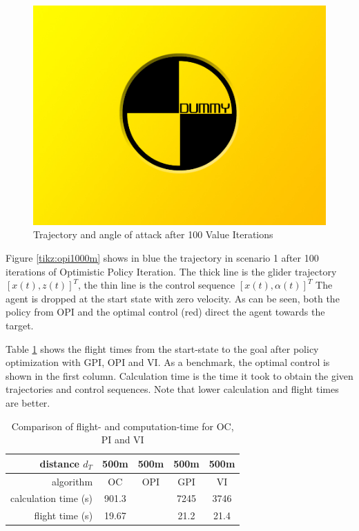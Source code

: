 \begin{figure}[h]
	\includegraphics[width=\textwidth]{src/pics/dummy.jpg}
	\caption{Trajectory and angle of attack after 100 Value Iterations}
	\label{fig:2d_trajectory_VI}
\end{figure}

Figure \ref{tikz:opi1000m} shows in blue the trajectory in scenario 1 after 100 iterations of Optimistic Policy Iteration. The thick line is the glider trajectory $[x(t),z(t)]^T$, the thin line is the control sequence $[x(t),\alpha(t)]^T$ The agent is dropped at the start state with zero velocity. As can be seen, both the policy from OPI and the optimal control (red) direct the agent towards the target.

Table \ref{tab:2d_flight_times} shows the flight times from the start-state to the goal after policy optimization with GPI, OPI and VI. As a benchmark, the optimal control  is shown in the first column. Calculation time is the time it took to obtain the given trajectories and control sequences. Note that lower calculation and flight times are better.

\begin{table}[h]
	\begin{center}
		\begin{tabular}{r|c c c c}
			distance $d_T$ & 500m & 500m & 500m & 500m \\ \hline 
			algorithm & OC & OPI & GPI & VI \\
			calculation time (s) & 901.3 & & 7245 & 3746 \\
			flight time (s) & 19.67 & & 21.2 & 21.4
		\end{tabular}
		\caption{Comparison of flight- and computation-time for OC, PI and VI}
		\label{tab:2d_flight_times}
	\end{center}
\end{table}

